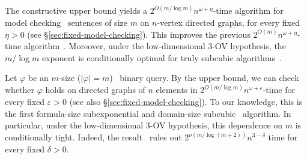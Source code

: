 The constructive upper bound yields a
$2^{O(m/\log m)}n^{\omega+\eta}$-time algorithm for model checking \FOthree\ sentences of size $m$ on $n$-vertex directed graphs, for every fixed $\eta>0$ (see \S\ref{sec:fixed-model-checking}).
%
This improves the previous $2^{O(m)}n^{\omega+\eta}$-time algorithm~\citep[Theorem~10]{nakamura-uezato2027}.
%
Moreover, under the low-dimensional 3-OV hypothesis, the $m/\log m$ exponent is conditionally optimal for truly subcubic algorithms~\citep[Theorem~72]{nakamura-uezato2027}.
\fi

Let $\varphi$ be an $m$-size ($|\varphi| = m$) \FOthree\ binary query.
By the upper bound,
we can check whether $\varphi$ holds on directed graphs of $n$ elements in
$2^{O(m/\log m)}n^{\omega+\varepsilon}$-time
for every fixed $\varepsilon>0$
(see also \S\ref{sec:fixed-model-checking}).
To our knowledge, this is the first formula-size subexponential and domain-size subcubic \FOthree\ algorithm.
In particular, under the low-dimensional 3-OV hypothesis, this dependence on $m$ is conditionally tight.
Indeed, the result~\citep[Theorem~72]{nakamura-uezato2027} rules out $2^{o(m/\log(m+2))}n^{3-\delta}$ time for every fixed
$\delta>0$.
\fi
